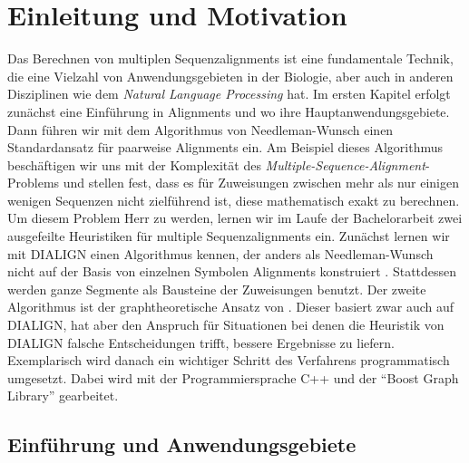 \chapter{Einleitung und Motivation}
\label{ch:einleitung}

Das Berechnen von multiplen Sequenzalignments ist eine fundamentale Technik, die eine Vielzahl von Anwendungsgebieten in der Biologie, aber auch in anderen Disziplinen wie dem \emph{Natural Language Processing} hat. Im ersten Kapitel erfolgt zunächst eine Einführung in Alignments und wo ihre Hauptanwendungsgebiete. Dann führen wir mit dem Algorithmus von Needleman-Wunsch einen Standardansatz für paarweise Alignments ein. Am Beispiel dieses Algorithmus beschäftigen wir uns mit der Komplexität des \emph{Multiple-Sequence-Alignment}-Problems und stellen fest, dass es für Zuweisungen zwischen mehr als nur einigen wenigen Sequenzen nicht zielführend ist, diese mathematisch exakt zu berechnen. Um diesem Problem Herr zu werden, lernen wir im Laufe der Bachelorarbeit zwei ausgefeilte Heuristiken für multiple Sequenzalignments ein. Zunächst lernen wir mit DIALIGN einen Algorithmus kennen, der anders als Needleman-Wunsch nicht auf der Basis von einzelnen Symbolen Alignments konstruiert \cite{mdw96}. Stattdessen werden ganze Segmente als Bausteine der Zuweisungen benutzt. Der zweite Algorithmus ist der graphtheoretische Ansatz von \cite{cpm10}. Dieser basiert zwar auch auf DIALIGN, hat aber den Anspruch für Situationen bei denen die Heuristik von DIALIGN falsche Entscheidungen trifft, bessere Ergebnisse zu liefern. Exemplarisch wird danach ein wichtiger Schritt des Verfahrens programmatisch umgesetzt. Dabei wird mit der Programmiersprache C++ und der \enquote{Boost Graph Library} gearbeitet.

\section{Einführung und Anwendungsgebiete}

